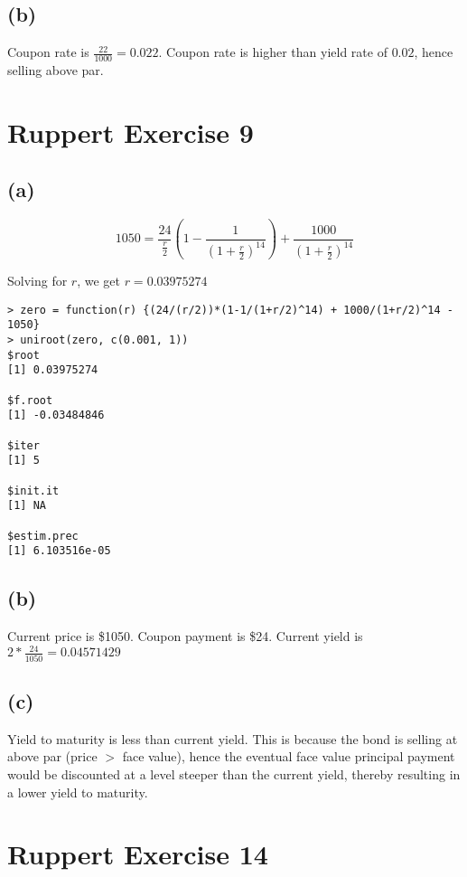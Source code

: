 \documentclass[11pt]{scrartcl}
\begin{document}
\subsection*{(b)}

Coupon rate is $\frac{22}{1000} = 0.022$. Coupon rate is higher than yield rate of $0.02$, hence selling above par.

\section*{Ruppert Exercise 9}

\subsection*{(a)}

\[1050 = \frac{24}{\frac{r}{2}}\left(1-\frac{1}{\left(1+\frac{r}{2}\right)^{14}}\right) + \frac{1000}{\left(1+\frac{r}{2}\right)^{14}}\]

Solving for $r$, we get $r=0.03975274$

\begin{lstlisting}
> zero = function(r) {(24/(r/2))*(1-1/(1+r/2)^14) + 1000/(1+r/2)^14 - 1050}
> uniroot(zero, c(0.001, 1))
$root
[1] 0.03975274

$f.root
[1] -0.03484846

$iter
[1] 5

$init.it
[1] NA

$estim.prec
[1] 6.103516e-05
\end{lstlisting}

\subsection*{(b)}

Current price is \$1050. Coupon payment is \$24. Current yield is $2*\frac{24}{1050} = 0.04571429$

\subsection*{(c)}

Yield to maturity is less than current yield. This is because the bond is selling at above par (price $>$ face value), hence the eventual face value principal payment would be discounted at a level steeper than the current yield, thereby resulting in a lower yield to maturity.

\section*{Ruppert Exercise 14}
\end{document}
